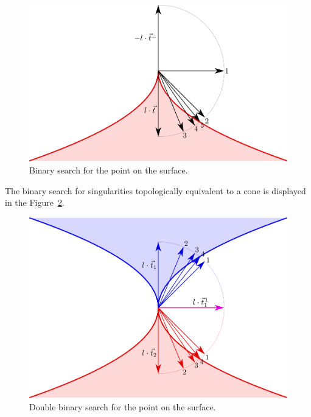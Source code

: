\begin{figure}
    \centerline{\includegraphics[scale=0.5]{images/img41}}
    \caption[Binary search for the point on the surface]
    {Binary search for the point on the surface.}
    \label{img:41}
\end{figure}

The binary search for singularities topologically equivalent to a cone is displayed
in the Figure~\ref{img:45}.

\begin{figure}
    \centerline{\includegraphics[scale=0.5]{images/img45}}
    \caption[Double binary search for the point on the surface]
    {Double binary search for the point on the surface.}
    \label{img:45}
\end{figure}

